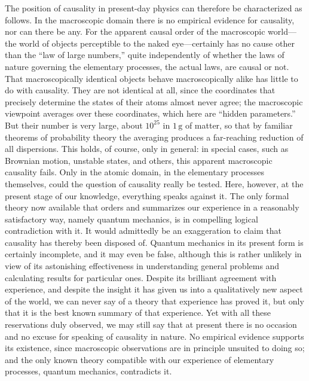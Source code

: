 \documentclass[fontsize=13pt,twoside,openany,headings=normal,parskip=false,bookmarkpackage=false,DIV=calc]{scrbook}
\begin{document}
The position of causality in present-day physics can therefore be characterized as follows. In the macroscopic domain there is no empirical evidence for causality, nor can there be any. For the apparent causal order of the macroscopic world---the world of objects perceptible to the naked eye---certainly has no cause other than the ``law of large numbers,'' quite independently of whether the laws of nature governing the elementary processes, the actual laws, are causal or not. That macroscopically identical objects behave macroscopically alike has little to do with causality. They are not identical at all, since the coordinates that precisely determine the states of their atoms almost never agree; the macroscopic viewpoint averages over these coordinates, which here are ``hidden parameters.'' But their number is very large, about $10^{25}$ in $1\,\mathrm g$ of matter, so that by familiar theorems of probability theory the averaging produces a far-reaching reduction of all dispersions. This holds, of course, only in general: in special cases, such as Brownian motion, unstable states, and others, this apparent macroscopic causality fails. Only in the atomic domain, in the elementary processes themselves, could the question of
\hypertarget{origpage-173}{}%
causality really be tested. Here, however, at the present stage of our knowledge, everything speaks against it. The only formal theory now available that orders and summarizes our experience in a reasonably satisfactory way, namely quantum mechanics, is in compelling logical contradiction with it. It would admittedly be an exaggeration to claim that causality has thereby been disposed of. Quantum mechanics in its present form is certainly incomplete, and it may even be false, although this is rather unlikely in view of its astonishing effectiveness in understanding general problems and calculating results for particular ones. Despite its brilliant agreement with experience, and despite the insight it has given us into a qualitatively new aspect of the world, we can never say of a theory that experience has proved it, but only that it is the best known summary of that experience. Yet with all these reservations duly observed, we may still say that at present there is no occasion and no excuse for speaking of causality in nature. No empirical evidence supports its existence, since macroscopic observations are in principle unsuited to doing so; and the only known theory compatible with our experience of elementary processes, quantum mechanics, contradicts it.
\end{document}
